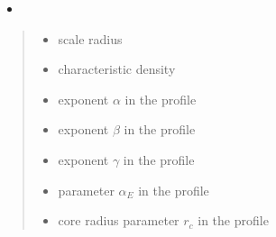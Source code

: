 \documentclass[letterpaper,10pt,english]{sphinxmanual}
\begin{document}
\begin{fulllineitems}
\begin{quote}
\begin{description}
\end{description}\end{quote}
\begin{itemize}
\item {} 
\sphinxAtStartPar
{}

\end{itemize}
\begin{quote}\begin{description}
\begin{itemize}
\item {} 
\sphinxAtStartPar
{} \textendash{} scale radius

\item {} 
\sphinxAtStartPar
{} \textendash{} characteristic density

\item {} 
\sphinxAtStartPar
{} \textendash{} exponent \(\alpha\) in the {\hyperref[\detokenize{diffsph.profiles:diffsph.profiles.templates.hdz}]{}} profile

\item {} 
\sphinxAtStartPar
{} \textendash{} exponent \(\beta\) in the {\hyperref[\detokenize{diffsph.profiles:diffsph.profiles.templates.hdz}]{}} profile

\item {} 
\sphinxAtStartPar
{} \textendash{} exponent \(\gamma\) in the {\hyperref[\detokenize{diffsph.profiles:diffsph.profiles.templates.hdz}]{}} profile

\item {} 
\sphinxAtStartPar
{} \textendash{} parameter \(\alpha_E\) in the {\hyperref[\detokenize{diffsph.profiles:diffsph.profiles.templates.enst}]{}} profile

\item {} 
\sphinxAtStartPar
{} \textendash{} core radius parameter \(r_c\) in the {\hyperref[\detokenize{diffsph.profiles:diffsph.profiles.templates.cnfw}]{}} profile


\end{itemize}
\end{description}
\end{quote}
\end{fulllineitems}
\end{document}
